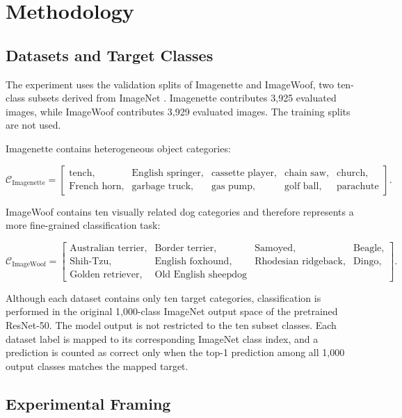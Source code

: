 \section{Methodology}

\subsection{Datasets and Target Classes}

The experiment uses the validation splits of Imagenette and ImageWoof, two
ten-class subsets derived from ImageNet \cite{fastai_imagenette,deng2009imagenet}. Imagenette contributes 3,925 evaluated
images, while ImageWoof contributes 3,929 evaluated images. The training splits
are not used.

Imagenette contains heterogeneous object categories:

\[
\mathcal{C}_{\text{Imagenette}} =
\left[
\begin{array}{lllll}
\text{tench}, &
\text{English springer}, &
\text{cassette player}, &
\text{chain saw}, &
\text{church}, \\
\text{French horn}, &
\text{garbage truck}, &
\text{gas pump}, &
\text{golf ball}, &
\text{parachute}
\end{array}
\right].
\]

ImageWoof contains ten visually related dog categories and therefore represents
a more fine-grained classification task:

\[
\mathcal{C}_{\text{ImageWoof}} =
\left[
\begin{array}{llll}
\text{Australian terrier}, &
\text{Border terrier}, &
\text{Samoyed}, &
\text{Beagle}, \\
\text{Shih-Tzu}, &
\text{English foxhound}, &
\text{Rhodesian ridgeback}, &
\text{Dingo}, \\
\text{Golden retriever}, &
\text{Old English sheepdog}
\end{array}
\right].
\]

Although each dataset contains only ten target categories, classification is
performed in the original 1,000-class ImageNet output space of the pretrained
ResNet-50. The model output is not restricted to the ten subset classes. Each
dataset label is mapped to its corresponding ImageNet class index, and a
prediction is counted as correct only when the top-1 prediction among all
1,000 output classes matches the mapped target.
\subsection{Experimental Framing}

